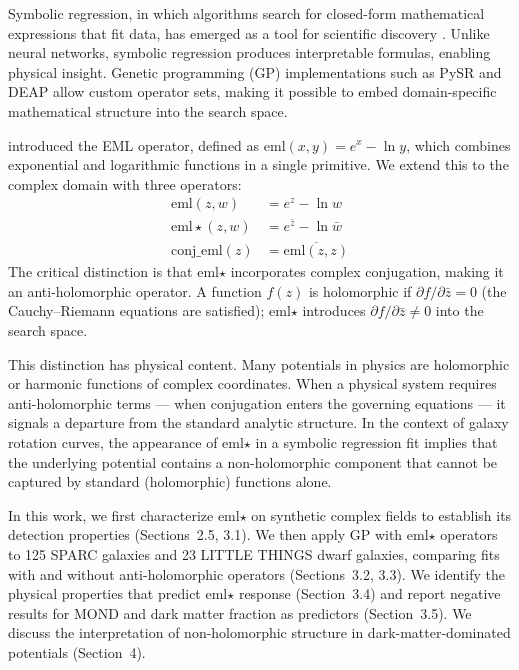 \documentclass[12pt,a4paper]{article}
\begin{document}
Symbolic regression, in which algorithms search for closed-form mathematical expressions that fit data, has emerged as a tool for scientific discovery \citep{Schmidt2009}. Unlike neural networks, symbolic regression produces interpretable formulas, enabling physical insight. Genetic programming (GP) implementations such as PySR \citep{Cranmer2023} and DEAP \citep{Fortin2012} allow custom operator sets, making it possible to embed domain-specific mathematical structure into the search space.

\citet{Odrzywolek2026} introduced the EML operator, defined as $\mathrm{eml}(x, y) = e^x - \ln y$, which combines exponential and logarithmic functions in a single primitive. We extend this to the complex domain with three operators:
\begin{align}
\mathrm{eml}(z, w) &= e^z - \ln w \\
\mathrm{eml\star}(z, w) &= e^{\bar{z}} - \ln \bar{w} \\
\mathrm{conj\_eml}(z) &= \overline{\mathrm{eml}(z, z)}
\end{align}
The critical distinction is that eml$\star$ incorporates complex conjugation, making it an anti-holomorphic operator. A function $f(z)$ is holomorphic if $\partial f/\partial \bar{z} = 0$ (the Cauchy--Riemann equations are satisfied); eml$\star$ introduces $\partial f/\partial \bar{z} \neq 0$ into the search space.

This distinction has physical content. Many potentials in physics are holomorphic or harmonic functions of complex coordinates. When a physical system requires anti-holomorphic terms --- when conjugation enters the governing equations --- it signals a departure from the standard analytic structure. In the context of galaxy rotation curves, the appearance of eml$\star$ in a symbolic regression fit implies that the underlying potential contains a non-holomorphic component that cannot be captured by standard (holomorphic) functions alone.

In this work, we first characterize eml$\star$ on synthetic complex fields to establish its detection properties (Sections~2.5, 3.1). We then apply GP with eml$\star$ operators to 125 SPARC galaxies and 23 LITTLE THINGS dwarf galaxies, comparing fits with and without anti-holomorphic operators (Sections~3.2, 3.3). We identify the physical properties that predict eml$\star$ response (Section~3.4) and report negative results for MOND and dark matter fraction as predictors (Section~3.5). We discuss the interpretation of non-holomorphic structure in dark-matter-dominated potentials (Section~4).
\end{document}
